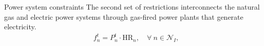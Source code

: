\documentclass[hyperref={colorlinks,citecolor=blue,linkcolor=blue,urlcolor=blue}]{beamer}
\begin{document}
\begin{frame}{Power system constraints}
\vspace{1em}
The second set of restrictions interconnects the natural gas and electric power systems through gas-fired power plants that generate electricity.
    \begin{align}
    &f_{n}^t = P_{n}^t \cdot \text{HR}_n, \quad \forall \ n \in \mathcal{N}_I, \label{eq:gas_power_relation} 
\end{align}
\end{frame}


%
\end{document}
